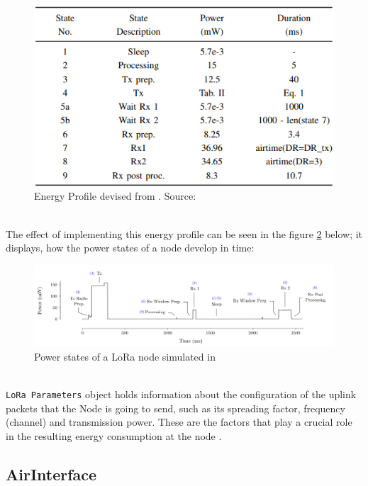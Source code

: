 \begin{figure}[h!]
  \centering
  \includegraphics[scale=0.7]{figures/energy_profile.PNG}
  \caption{Energy Profile devised from \cite{energy_profile}. Source: \cite{simulator}}
  \label{fig:energy_profile}
\end{figure}\\

The effect of implementing this energy profile can be seen in the figure \ref{fig:power_states} below; it displays, how the power states of a node develop in time:

\begin{figure}[h!]
  \centering
  \hspace*{-1cm}  
  \includegraphics[scale=0.5]{figures/class A 2.PNG}
  \caption{Power states of a LoRa node simulated in \cite{simulator}}
  \label{fig:power_states}
\end{figure}\\

\texttt{LoRa Parameters} object holds information about the configuration of the uplink packets that the Node is going to send, such as its spreading factor, frequency (channel) and transmission power. These are the factors that play a crucial role in the resulting energy consumption at the node \cite{simulator}.

\subsection{AirInterface}

